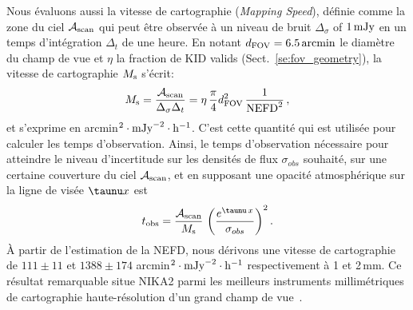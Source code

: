 Nous évaluons aussi la vitesse de cartographie (\emph{Mapping Speed}), 
définie comme la zone du ciel $\mathcal{A}_{\rm{scan}}$ qui peut être
observée à un niveau de bruit $\Delta_\sigma$ of $1\,\rm{mJy}$ en un
temps d'intégration $\Delta_t$ de une heure. En notant $d_{\rm{FOV}} =
6.5\,\rm{arcmin}$ le diamètre du champ de vue et $\eta$ la fraction de
KID valids (Sect.~\ref{se:fov_geometry}), la vitesse de cartographie
$M_{\rm{s}}$ s'écrit: 
\begin{equation}
M_{\rm{s}} = \frac{\mathcal{A}_{\rm{scan}}}{\Delta_\sigma\Delta_t} = 
\eta \, \frac{\pi}{4} d_{\rm{FOV}}^2 \, \frac{1}{\rm{NEFD}^2}\, ,
\label{eq:mapping_speed}
\end{equation}
et s'exprime en arcmin$^2 \cdot \rm{mJy}^{-2} \cdot
\rm{h}^{-1}$. C'est cette quantité qui est utilisée pour calculer
les temps d'observation. Ainsi, le temps d'observation nécessaire pour
atteindre le niveau d'incertitude sur les densités de flux
$\sigma_{obs}$ souhaité, sur une certaine couverture du ciel
$\mathcal{A}_{\rm{scan}}$, et en supposant une opacité atmosphérique
  sur la ligne de visée $\taunu x$ est
\begin{equation}
  t_{\rm{obs}} = \frac{\mathcal{A}_{\rm{scan}}}{ M_{\rm{s}}} \, \left(\frac{e^{\taunu\, x}}{\sigma_{obs}}\right)^2.
\end{equation}
\`A partir de l'estimation de la NEFD, nous dérivons une vitesse de
cartographie de $111 \pm 11$ et $1388 \pm 174$ arcmin$^2 \cdot
\rm{mJy}^{-2} \cdot \rm{h}^{-1}$ respectivement à 1 et
2\,mm. Ce résultat remarquable situe NIKA2 parmi les meilleurs
instruments millimétriques de cartographie haute-résolution d'un grand
champ de vue~\citep{Tony2019}.

